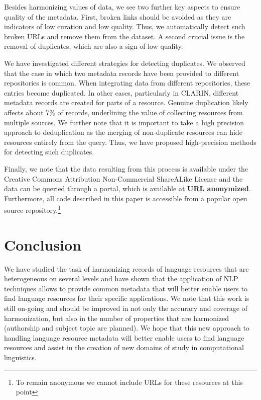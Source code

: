 \documentclass[11pt]{article}
\begin{document}
Besides harmonizing values of data, we see two further key aspects to ensure
quality of the metadata.  First, broken links should be avoided as they are
indicators of low curation and low quality. Thus, we automatically detect such
broken URLs and remove them from the dataset. A second crucial issue is the
removal of duplicates, which are also a sign of low quality.

We have investigated different strategies for detecting duplicates. We observed
that the case in which two metadata records have been provided to different
repositories is common. When integrating data from different repositories, these
entries become duplicated. In other cases, particularly in CLARIN, different
metadata records are created for parts of a resource. Genuine duplication likely
affects about 7\% of records, underlining the value of collecting resources from
multiple sources. We further note that it is important to take a high precision
approach to deduplication as the merging of non-duplicate resources can hide
resources entirely from the query. Thus, we have proposed high-precision methods
for detecting such duplicates. 

Finally, we note that the data resulting from this process is available under
the Creative Commons Attribution Non-Commercial ShareALike License and the data
can be queried through a portal, which is available at \textbf{URL anonymized}.
Furthermore, all code described in this paper is accessible from a popular open
source repository.\footnote{To remain anonymous we cannot include URLs for these
resources at this point}

\section{Conclusion}

We have studied the task of harmonizing records of language resources that are
heterogeneous on several levels and have shown that the application of NLP
techniques allows to provide common metadata that will better enable users to
find language resources for their specific applications. We note that this work
is still on-going and should be improved in not only the accuracy and coverage
of harmonization, but also in the number of properties that are harmonized
(authorship and subject topic are planned). We hope that this new approach to
handling language resource metadata will better enable users to find language
resources and assist in the creation of new domains of study in computational
linguistics.
\end{document}

